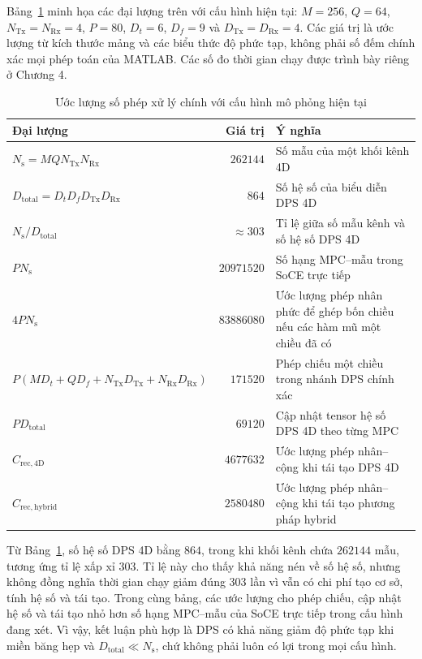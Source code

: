 Bảng~\ref{tab:ch2_operation_estimate} minh họa các đại lượng trên với cấu hình hiện tại: \(M=256\), \(Q=64\), \(N_{\mathrm{Tx}}=N_{\mathrm{Rx}}=4\), \(P=80\), \(D_t=6\), \(D_f=9\) và \(D_{\mathrm{Tx}}=D_{\mathrm{Rx}}=4\). Các giá trị là ước lượng từ kích thước mảng và các biểu thức độ phức tạp, không phải số đếm chính xác mọi phép toán của MATLAB. Các số đo thời gian chạy được trình bày riêng ở Chương 4.

\begin{table}[H]
    \centering
    \small
    \caption{Ước lượng số phép xử lý chính với cấu hình mô phỏng hiện tại}
    \label{tab:ch2_operation_estimate}
    \begin{tabularx}{\textwidth}{l r >{\raggedright\arraybackslash}X}
        \toprule
        Đại lượng & Giá trị & Ý nghĩa \\
        \midrule
        \(N_{\mathrm{s}}=MQN_{\mathrm{Tx}}N_{\mathrm{Rx}}\) & \(262144\) & Số mẫu của một khối kênh 4D \\
        \(D_{\mathrm{total}}=D_tD_fD_{\mathrm{Tx}}D_{\mathrm{Rx}}\) & \(864\) & Số hệ số của biểu diễn DPS 4D \\
        \(N_{\mathrm{s}}/D_{\mathrm{total}}\) & \(\approx 303\) & Tỉ lệ giữa số mẫu kênh và số hệ số DPS 4D \\
        \(PN_{\mathrm{s}}\) & \(20971520\) & Số hạng MPC--mẫu trong SoCE trực tiếp \\
        \(4PN_{\mathrm{s}}\) & \(83886080\) & Ước lượng phép nhân phức để ghép bốn chiều nếu các hàm mũ một chiều đã có \\
        \(P(MD_t+QD_f+N_{\mathrm{Tx}}D_{\mathrm{Tx}}+N_{\mathrm{Rx}}D_{\mathrm{Rx}})\) & \(171520\) & Phép chiếu một chiều trong nhánh DPS chính xác \\
        \(PD_{\mathrm{total}}\) & \(69120\) & Cập nhật tensor hệ số DPS 4D theo từng MPC \\
        \(C_{\mathrm{rec},\mathrm{4D}}\) & \(4677632\) & Ước lượng phép nhân--cộng khi tái tạo DPS 4D \\
        \(C_{\mathrm{rec},\mathrm{hybrid}}\) & \(2580480\) & Ước lượng phép nhân--cộng khi tái tạo phương pháp hybrid \\
        \bottomrule
    \end{tabularx}
\end{table}

Từ Bảng~\ref{tab:ch2_operation_estimate}, số hệ số DPS 4D bằng \(864\), trong khi khối kênh chứa \(262144\) mẫu, tương ứng tỉ lệ xấp xỉ \(303\). Tỉ lệ này cho thấy khả năng nén về số hệ số, nhưng không đồng nghĩa thời gian chạy giảm đúng \(303\) lần vì vẫn có chi phí tạo cơ sở, tính hệ số và tái tạo. Trong cùng bảng, các ước lượng cho phép chiếu, cập nhật hệ số và tái tạo nhỏ hơn số hạng MPC--mẫu của SoCE trực tiếp trong cấu hình đang xét. Vì vậy, kết luận phù hợp là DPS có khả năng giảm độ phức tạp khi miền băng hẹp và \(D_{\mathrm{total}}\ll N_{\mathrm{s}}\), chứ không phải luôn có lợi trong mọi cấu hình.

